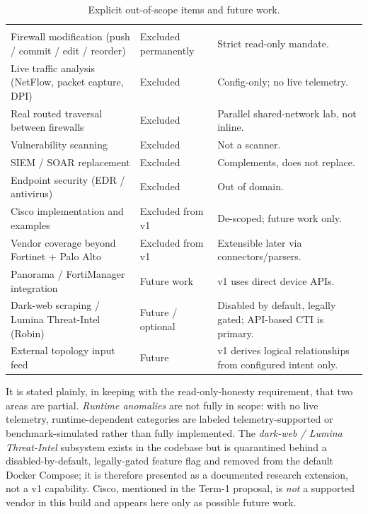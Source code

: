 \begin{longtable}{L{0.40\textwidth} L{0.24\textwidth} L{0.28\textwidth}}
\caption{Explicit out-of-scope items and future work.}\label{tab:ch1-scope-out}\\
\hline
{} &  &  \\ \hline
\endfirsthead
\hline
{} &  &  \\ \hline
\endhead
Firewall modification (push / commit / edit / reorder) & Excluded permanently & Strict read-only mandate. \\
Live traffic analysis (NetFlow, packet capture, DPI) & Excluded & Config-only; no live telemetry. \\
Real routed traversal between firewalls & Excluded & Parallel shared-network lab, not inline. \\
Vulnerability scanning & Excluded & Not a scanner. \\
SIEM / SOAR replacement & Excluded & Complements, does not replace. \\
Endpoint security (EDR / antivirus) & Excluded & Out of domain. \\
Cisco implementation and examples & Excluded from v1 & De-scoped; future work only. \\
Vendor coverage beyond Fortinet + Palo Alto & Excluded from v1 & Extensible later via connectors/parsers. \\
Panorama / FortiManager integration & Future work & v1 uses direct device APIs. \\
Dark-web scraping / Lumina Threat-Intel (Robin) & Future / optional & Disabled by default, legally gated; API-based CTI is primary. \\
External topology input feed & Future & v1 derives logical relationships from configured intent only. \\ \hline
\end{longtable}

It is stated plainly, in keeping with the read-only-honesty requirement, that two areas are partial. \emph{Runtime anomalies} are not fully in scope: with no live telemetry, runtime-dependent categories are labeled telemetry-supported or benchmark-simulated rather than fully implemented. The \emph{dark-web / Lumina Threat-Intel} subsystem exists in the codebase but is quarantined behind a disabled-by-default, legally-gated feature flag and removed from the default Docker Compose; it is therefore presented as a documented research extension, not a v1 capability. Cisco, mentioned in the Term-1 proposal, is \emph{not} a supported vendor in this build and appears here only as possible future work.

